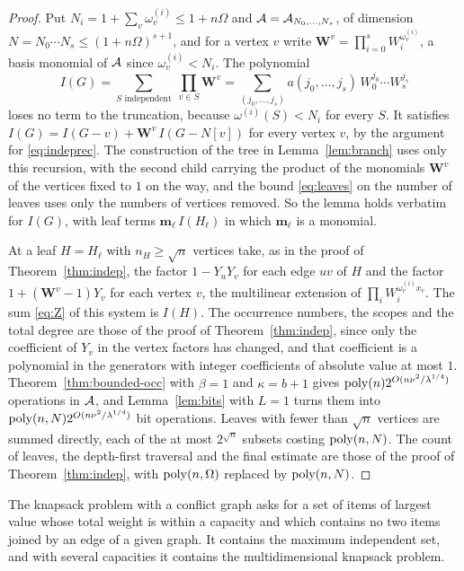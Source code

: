 \begin{proof}
Put $N_i=1+\sum_v\omega^{(i)}_v\le1+n\Omega$ and $\mathcal{A}=\mathcal{A}_{N_0,\dots,N_s}$, of
dimension $N=N_0\cdots N_s\le(1+n\Omega)^{s+1}$, and for a vertex $v$ write
$\mathbf W^{v}=\prod_{i=0}^{s}W_i^{\omega^{(i)}_v}$, a basis monomial of $\mathcal{A}$ since
$\omega^{(i)}_v<N_i$. The
polynomial
\[
  I(G)=\sum_{S\text{ independent}}\ \prod_{v\in S}\mathbf W^{v}
  =\sum_{(j_0,\dots,j_s)}a(j_0,\dots,j_s)\,W_0^{j_0}\cdots W_s^{j_s}
\]
loses no term to the truncation, because $\omega^{(i)}(S)<N_i$ for every $S$.
It satisfies $I(G)=I(G-v)+\mathbf W^{v}\,I(G-N[v])$ for every vertex $v$, by the
argument for \eqref{eq:indeprec}. The construction of the tree in
Lemma~\ref{lem:branch} uses only this recursion, with the second child carrying
the product of the monomials $\mathbf W^{v}$ of the vertices fixed to $1$ on the
way, and the bound \eqref{eq:leaves} on the number of leaves uses only the
numbers of vertices removed. So the lemma holds verbatim for $I(G)$, with leaf
terms $\mathbf m_\ell\,I(H_\ell)$ in which $\mathbf m_\ell$ is a monomial.

At a leaf $H=H_\ell$ with $n_H\ge\sqrt n$ vertices take, as in the proof of
Theorem~\ref{thm:indep}, the factor $1-Y_uY_v$ for each edge $uv$ of $H$ and
the factor $1+(\mathbf W^{v}-1)Y_v$ for each vertex $v$, the multilinear
extension of $\prod_i W_i^{\omega^{(i)}_vx_v}$. The sum \eqref{eq:Z} of this
system is $I(H)$. The occurrence numbers, the scopes and the total degree are
those of the proof of Theorem~\ref{thm:indep}, since only the coefficient of
$Y_v$ in the vertex factors has changed, and that coefficient is a polynomial
in the generators with integer coefficients of absolute value at most $1$.
Theorem~\ref{thm:bounded-occ} with $\beta=1$ and $\kappa=b+1$ gives
$\operatorname{poly}(n)2^{O(n\nu^2/\lambda^{1/4})}$ operations in $\mathcal{A}$, and
Lemma~\ref{lem:bits} with $L=1$ turns them into
$\operatorname{poly}(n,N)2^{O(n\nu^2/\lambda^{1/4})}$ bit operations. Leaves with fewer than
$\sqrt n$ vertices are summed directly, each of the at most $2^{\sqrt n}$
subsets costing $\operatorname{poly}(n,N)$. The count of leaves, the depth-first traversal
and the final estimate are those of the proof of Theorem~\ref{thm:indep}, with
$\operatorname{poly}(n,\Omega)$ replaced by $\operatorname{poly}(n,N)$.
\end{proof}

The knapsack problem with a conflict graph \cite{PS09} asks for a set of items
of largest value whose total weight is within a capacity and which contains no
two items joined by an edge of a given graph. It contains the maximum
independent set, and with several capacities it contains the multidimensional
knapsack problem.

